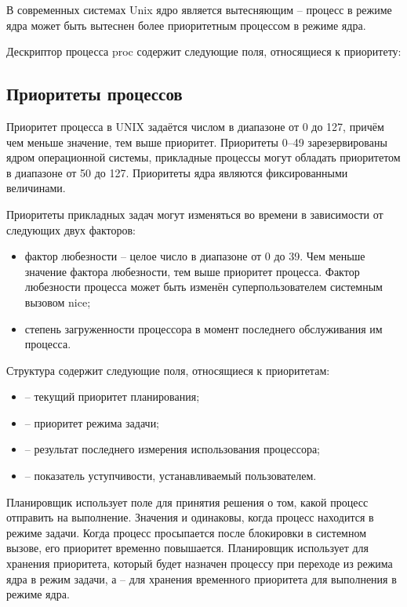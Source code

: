 В современных системах {\ttfamily Unix} ядро является вытесняющим – процесс в режиме ядра может быть вытеснен более приоритетным процессом в режиме ядра.

 

Дескриптор процесса proc содержит следующие поля, относящиеся к приоритету:

\subsection{Приоритеты процессов}

Приоритет процесса в {\ttfamily UNIX} задаётся числом в диапазоне от 0 до 127, причём чем меньше значение, тем выше приоритет. Приоритеты 0--49 зарезервированы ядром операционной системы, прикладные процессы могут обладать приоритетом в диапазоне от 50 до 127. Приоритеты ядра являются фиксированными величинами.

Приоритеты прикладных задач могут изменяться во времени в зависимости от следующих двух факторов:

\begin{itemize}
	\item фактор любезности – целое число в диапазоне от 0 до 39. Чем меньше значение фактора любезности, тем выше приоритет процесса. Фактор любезности процесса может быть изменён суперпользователем системным вызовом {\ttfamily nice};
	
	\item степень загруженности процессора в момент последнего обслуживания им процесса.
\end{itemize}

Структура  содержит следующие поля, относящиеся к приоритетам:
\begin{itemize}
	\item {} -- текущий приоритет планирования;
	\item {} -- приоритет режима задачи;
	\item {} -- результат последнего измерения использования процессора;
	\item {} -- показатель уступчивости, устанавливаемый пользователем.
\end{itemize}

Планировщик использует поле  для принятия решения о том, какой процесс отправить на выполнение. Значения  и  одинаковы, когда процесс находится в режиме задачи. Когда процесс просыпается после блокировки в системном вызове, его приоритет временно повышается. Планировщик использует  для хранения приоритета, который будет назначен процессу при переходе из режима ядра в режим задачи, а  -- для хранения временного приоритета для выполнения в режиме ядра.

